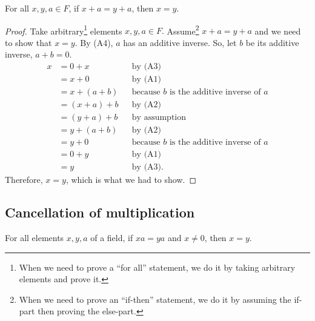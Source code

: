 \documentclass[11pt]{article}
\begin{document}
    For all \(x,y,a \in F\), if \(x + a = y + a\), then \(x = y\).
    \begin{proof}
        Take arbitrary\footnote{When we need to prove a ``for all'' statement, we do it by taking arbitrary elements and prove it.} elements \(x,y,a \in F.\) Assume\footnote{When we need to prove an ``if-then'' statement, we do it by assuming the if-part then proving the else-part.} \(x + a = y + a\) and we need to show that \(x = y\). By (A4), $a$ has an additive inverse. So, let $b$ be its additive inverse, \(a + b = 0.\)
        \begin{align*}
            x &= 0 + x          && \text{by (A3)} \\
              &= x + 0          && \text{by (A1)} \\
              &= x + (a + b)    && \text{because $b$ is the additive inverse of $a$} \\
              &= (x + a) + b    && \text{by (A2)} \\
              &= (y + a) + b    && \text{by assumption} \\
              &= y + (a + b)    && \text{by (A2)} \\
              &= y + 0          && \text{because $b$ is the additive inverse of $a$} \\
              &= 0 + y          && \text{by (A1)} \\
              &= y              && \text{by (A3).}
        \end{align*}
        Therefore, \(x = y\), which is what we had to show.
    \end{proof}

    \subsection{Cancellation of multiplication}

    For all elements \(x,y,a\) of a field, if \(xa = ya\) and \(x \neq 0\), then \(x = y\).
\end{document}
